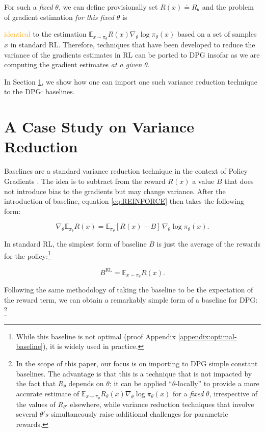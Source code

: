  For such a \emph{fixed} $\theta$, we can define provisionally set $R(x)\doteq R_\theta$ and the problem of gradient estimation \emph{for this fixed $\theta$} is 

 \textcolor{orange}{identical}
 to the estimation $\mathbb{E}_{x\sim {\pi_\theta}} R(x) \nabla_\theta \log {\pi_\theta}(x)$ based on a set of samples $x$ in standard RL. Therefore, techniques that have been developed to reduce the variance of the gradients estimates in RL can be ported to DPG insofar as we are computing the gradient estimates \emph{at a given $\theta$}. 

In Section \ref{section:method}, we show how one can import one such variance reduction technique to the DPG: baselines.

\section{A Case Study on Variance Reduction}\label{section:method}

Baselines are a standard variance reduction technique in the context of Policy Gradients \citep{Sutton2018}. The idea is to subtract from the reward $R(x)$ a value $B$ that does not introduce bias to the gradients but may change variance. After the introduction of baseline, equation \eqref{eq:REINFORCE} then takes the following form:

\begin{equation}
\label{pg_baseline}   
\nabla_\theta \mathbb{E}_{{\pi_\theta}} R(x) = \mathbb{E}_{{\pi_\theta}} [R(x)-B]\, \nabla_\theta \log {\pi_\theta}(x).
\end{equation}

In standard RL, the simplest form of baseline $B$ is just the average of the rewards for the policy:\footnote{While this baseline is not optimal (proof Appendix \ref{appendix:optimal-baseline}), it is widely used in practice.}

\begin{equation}
    \label{eq:B_rl}
    B^{\text{RL}} = \mathbb{E}_{x \sim \pi_\theta} R(x).
\end{equation}

Following the same methodology of taking the baseline to be the expectation of the reward term, we can obtain a remarkably simple form of a baseline for DPG:
\footnote{In the scope of this paper, our focus is on  importing to DPG simple constant baselines. The advantage is that this is a technique that is not impacted by the fact that $R_\theta$ depends on $\theta$: it can be applied ``$\theta$-locally'' to provide a more accurate estimate of $\mathbb{E}_{x \sim {\pi_\theta}} R_\theta(x) \nabla_{\theta} \log {\pi_\theta}(x)$ for a \emph{fixed} $\theta$, irrespective of the values of $R_{\theta'}$ elsewhere, while variance reduction techniques that involve several $\theta's$ simultaneously raise additional challenges for parametric rewards. }

